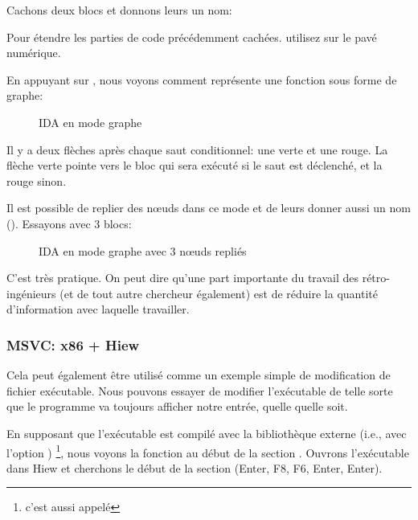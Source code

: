 Cachons deux blocs et donnons leurs un nom:



Pour étendre les parties de code précédemment cachées. utilisez \q{+} sur le
pavé numérique.

\clearpage
En appuyant sur , nous voyons comment \IDA représente une fonction sous
forme de graphe:

\begin{figure}[H]
\centering
{}
\caption{IDA en mode graphe}
\label{fig:ex3_IDA_1}
\end{figure}

Il y a deux flèches après chaque saut conditionnel: une verte et une rouge.
La flèche verte pointe vers le bloc qui sera exécuté si le saut est déclenché,
et la rouge sinon.

\clearpage
Il est possible de replier des nœuds dans ce mode et de leurs donner aussi un nom ().
Essayons avec 3 blocs:

\begin{figure}[H]
\centering
{}
\caption{IDA en mode graphe avec 3 nœuds repliés}
\label{fig:ex3_IDA_2}
\end{figure}

C'est très pratique.
On peut dire qu'une part importante du travail des rétro-ingénieurs (et de tout
autre chercheur également) est de réduire la quantité d'information avec laquelle
travailler.



\clearpage
\subsubsection{MSVC: x86 + Hiew}

Cela peut également être utilisé comme un exemple simple de modification de fichier
exécutable.
Nous pouvons essayer de modifier l'exécutable de telle sorte que le programme va
toujours afficher notre entrée, quelle quelle soit.

En supposant que l'exécutable est compilé avec la bibliothèque externe 
(i.e., avec l'option ) \footnote{c'est aussi appelé },
nous voyons la fonction \main au début de la section .
Ouvrons l'exécutable dans Hiew et cherchons le début de la section  (Enter,
F8, F6, Enter, Enter).


